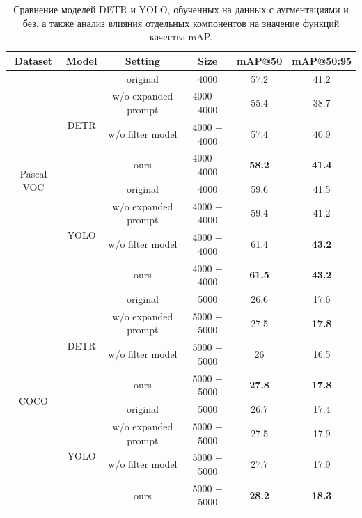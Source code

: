 \begin{table}[p]
\centering
\setlength{\tabcolsep}{2.5pt} %
\begin{tabular}{cccc|cc}
\toprule
\textbf{Dataset} & \textbf{Model} & \textbf{Setting} & \textbf{Size} & \textbf{mAP@50} & \textbf{mAP@50:95} \\
\midrule
\multirow{8}{*}{Pascal VOC} 
    & \multirow{4}{*}{DETR}
        & original                     & 4000  & 57.2 & 41.2 \\
        &                              & w/o expanded prompt          & 4000 + 4000  & 55.4 & 38.7 \\
        &                              & w/o filter model             & 4000 + 4000  & 57.4 & 40.9 \\
        &                              & ours                          & 4000 + 4000  & \textbf{58.2} & \textbf{41.4} \\
    \cline{2-6}
    & \multirow{4}{*}{YOLO}
        & original                     & 4000  & 59.6 & 41.5 \\
        &                              & w/o expanded prompt          & 4000 + 4000  & 59.4 & 41.2 \\
        &                              & w/o filter model             & 4000 + 4000  & 61.4 & \textbf{43.2} \\
        &                              & ours                          & 4000 + 4000  & \textbf{61.5} & \textbf{43.2} \\
\midrule
\multirow{8}{*}{COCO} 
    & \multirow{4}{*}{DETR}
        & original                     & 5000 & 26.6 & 17.6 \\
        &                              & w/o expanded prompt          & 5000 + 5000 & 27.5 & \textbf{17.8} \\
        &                              & w/o filter model             & 5000 + 5000 & 26 & 16.5 \\
        &                              & ours                          & 5000 + 5000 & \textbf{27.8} & \textbf{17.8} \\
    \cline{2-6}
    & \multirow{4}{*}{YOLO}
        & original                     & 5000 & 26.7 & 17.4 \\
        &                              & w/o expanded prompt          & 5000 + 5000 & 27.5 & 17.9 \\
        &                              & w/o filter model             & 5000 + 5000 & 27.7 & 17.9 \\
        &                              & ours                          & 5000 + 5000 & \textbf{28.2} & \textbf{18.3} \\
\bottomrule
\end{tabular}
\caption{Сравнение моделей DETR и YOLO, обученных на данных с аугментациями и без, а также анализ влияния отдельных компонентов на значение функций качества mAP.}
\label{tab:augmented-metrics}
\end{table}


